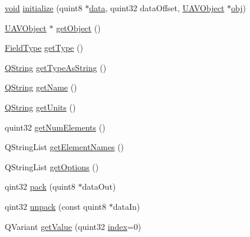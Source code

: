 \begin{DoxyCompactItemize}
\item 
\hyperlink{group___u_a_v_objects_plugin_ga444cf2ff3f0ecbe028adce838d373f5c}{void} \hyperlink{group___u_a_v_objects_plugin_ga76826ee85ebb06f48a3afb3cc7a1c839}{initialize} (quint8 $\ast$\hyperlink{glext_8h_a8850df0785e6fbcc2351af3b686b8c7a}{data}, quint32 data\-Offset, \hyperlink{class_u_a_v_object}{U\-A\-V\-Object} $\ast$\hyperlink{glext_8h_a0c0d4701a6c89f4f7f0640715d27ab26}{obj})
\item 
\hyperlink{class_u_a_v_object}{U\-A\-V\-Object} $\ast$ \hyperlink{group___u_a_v_objects_plugin_ga9a3e58eb1d96fbb375c9e28f870ae1d3}{get\-Object} ()
\item 
\hyperlink{group___u_a_v_objects_plugin_ga74498368bc91f3ed74beacb096744cf3}{Field\-Type} \hyperlink{group___u_a_v_objects_plugin_gad306893ea1f5623eaa970e35ffa7d901}{get\-Type} ()
\item 
\hyperlink{group___u_a_v_objects_plugin_gab9d252f49c333c94a72f97ce3105a32d}{Q\-String} \hyperlink{group___u_a_v_objects_plugin_ga53cf1cae78bc619ca91faffedacfc61f}{get\-Type\-As\-String} ()
\item 
\hyperlink{group___u_a_v_objects_plugin_gab9d252f49c333c94a72f97ce3105a32d}{Q\-String} \hyperlink{group___u_a_v_objects_plugin_ga86c7c87ecda0ed11b8a2f125b0741bab}{get\-Name} ()
\item 
\hyperlink{group___u_a_v_objects_plugin_gab9d252f49c333c94a72f97ce3105a32d}{Q\-String} \hyperlink{group___u_a_v_objects_plugin_gabb1e371d4c3d91f70a172d7827db2da8}{get\-Units} ()
\item 
quint32 \hyperlink{group___u_a_v_objects_plugin_ga6c929356a6e66fd7c56e9d547e67ef7c}{get\-Num\-Elements} ()
\item 
Q\-String\-List \hyperlink{group___u_a_v_objects_plugin_ga5686a3cb18234741a84666023acf4e8e}{get\-Element\-Names} ()
\item 
Q\-String\-List \hyperlink{group___u_a_v_objects_plugin_ga23e324a921bdf20972f940b4497a2c21}{get\-Options} ()
\item 
qint32 \hyperlink{group___u_a_v_objects_plugin_gabfadd471718e9a6bdb5e106fb99574d9}{pack} (quint8 $\ast$data\-Out)
\item 
qint32 \hyperlink{group___u_a_v_objects_plugin_ga8223d7b605648a98c12d00ae43febd5c}{unpack} (const quint8 $\ast$data\-In)
\item 
Q\-Variant \hyperlink{group___u_a_v_objects_plugin_ga60a1c56703ea2c28f76d1eaf05554f5e}{get\-Value} (quint32 \hyperlink{glext_8h_ab47dd9958bcadea08866b42bf358e95e}{index}=0)
\item 

\end{DoxyCompactItemize}
